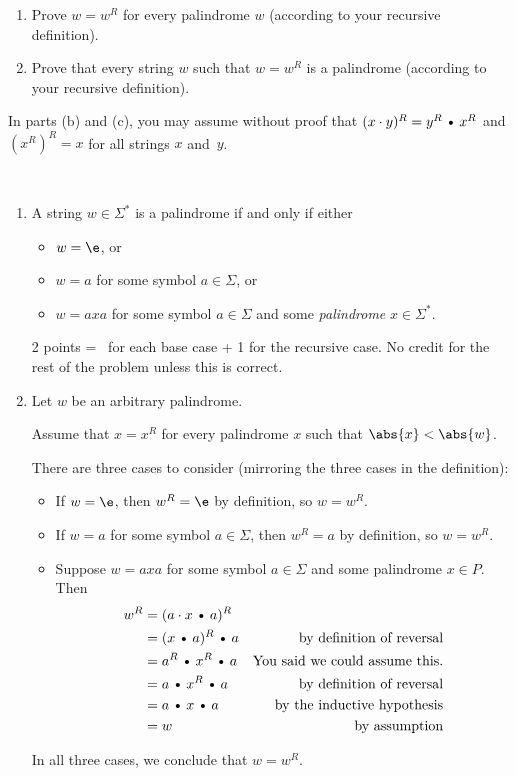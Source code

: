 \documentclass[11pt]{article}
\def\Cdot{\mathbin{\text{\normalfont \textbullet}}}
\begin{document}
\begin{enumerate}
\begin{enumerate}
\item
Prove $w = w^R$ for every palindrome $w$ (according to your recursive definition).  

\item
Prove that every string $w$ such that $w = w^R$ is a palindrome (according to your recursive definition).

\end{enumerate}
In parts (b) and (c), you may assume without proof that $(x\cdot y)^R = y^R\Cdot x^R$ and $(x^R)^R = x$ for all strings $x$ and~$y$.



\begin{solution}~
\begin{enumerate}
\item
A string $w\in\Sigma^*$ is a palindrome if and only if either
\begin{itemize}
\item $w = \e$, or
\item $w = a$ for some symbol $a\in\Sigma$, or
\item $w = axa$ for some symbol $a\in\Sigma$ and some \emph{palindrome} $x\in\Sigma^*$.
\end{itemize}

\begin{rubric}
2 points = \textonehalf\ for each base case + 1 for the recursive case.  No credit for the rest of the problem unless this is correct.
\end{rubric}


\medskip
\item
Let $w$ be an arbitrary palindrome.

Assume that $x = x^R$ for every palindrome $x$ such that $\abs{x}<\abs{w}$.

There are three cases to consider (mirroring the three cases in the definition):
\begin{itemize}
\item
If $w = \e$, then $w^R = \e$ by definition, so $w = w^R$.

\item
If $w = a$ for some symbol $a\in\Sigma$, then $w^R = a$ by definition, so $w = w^R$.

\item
Suppose $w = axa$ for some symbol $a\in\Sigma$ and some palindrome $x\in P$.  Then 
\begin{align*}
	w^R
	&=	(a \cdot x \Cdot a)^R		\\
	&=	(x\Cdot a)^R \Cdot a		& \text{by definition of reversal} \\
	&=	a^R \Cdot x^R \Cdot a		& \text{You said we could assume this.}\\
	&=	a \Cdot x^R \Cdot a			& \text{by definition of reversal} \\
	&=	a \Cdot x \Cdot a			& \text{by the inductive hypothesis} \\
	&=	w							& \text{by assumption}
\end{align*}
\end{itemize}
In all three cases, we conclude that $w = w^R$.


\end{enumerate}
\end{solution}
\end{enumerate}
\end{document}
